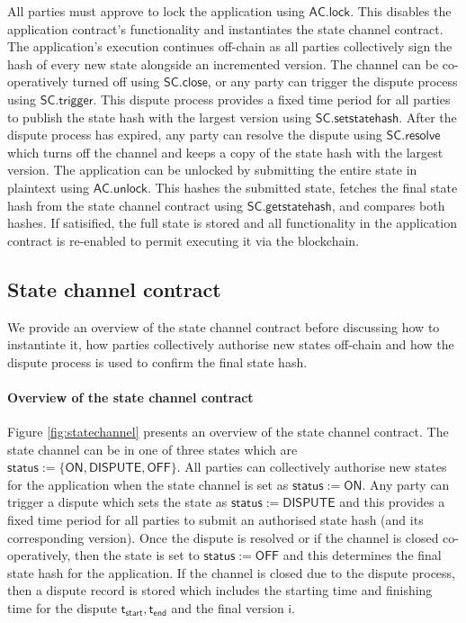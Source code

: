 \documentclass{llncs}
\newcommand{\chanstatus}{\mathsf{status}}
\newcommand{\chanon}{\mathsf{ON}}
\newcommand{\chandispute}{\mathsf{DISPUTE}}
\newcommand{\chanoff}{\mathsf{OFF}}
\newcommand{\monotoniccounter}{\mathsf{i}}
\newcommand{\statechanneldispute}{\mathsf{SC}.\mathsf{trigger}}
\newcommand{\statechannelsetstate}{\mathsf{SC}.\mathsf{setstatehash}}
\newcommand{\statechannelresolve}{\mathsf{SC}.\mathsf{resolve}}
\newcommand{\statechannelgetcommitment}{\mathsf{SC}.\mathsf{getstatehash}}
\newcommand{\statechannelclose}{\mathsf{SC}.\mathsf{close}}
\newcommand{\applock}{\mathsf{AC.lock}}
\newcommand{\appunlock}{\mathsf{AC.unlock}}
\newcommand{\timestart}{\mathsf{t}_{\mathsf{start}}}
\newcommand{\timeend}{\mathsf{t}_{\mathsf{end}}}
\begin{document}
All parties must approve to lock the application using $\applock$.
This disables the application contract's functionality and instantiates the state channel contract. 
The application's execution continues off-chain as all parties collectively sign the hash of every new state alongside an incremented version. %
The channel can be co-operatively turned off using $\statechannelclose$, or any party can trigger the dispute process using $\statechanneldispute$.
This dispute process provides  a fixed time period  for all parties to publish the state hash with the largest version using $\statechannelsetstate$. 
After the dispute process has expired, any party can resolve the dispute using $\statechannelresolve$ which turns off the channel and keeps a copy of the state hash with the largest version. 
The application can be unlocked by submitting the entire state in plaintext using $\appunlock$. 
This  hashes the submitted state, fetches the final state hash from the state channel contract using $\statechannelgetcommitment$, and  compares both hashes.
If satisified, the full state is stored and all functionality in the application contract is re-enabled to permit executing it via the blockchain. 
\subsection{State channel contract}

We provide an overview of the state channel contract before discussing how to instantiate it,  how parties collectively authorise new states off-chain and how the dispute process is used to confirm the final state hash. 

\paragraph{Overview of the state channel contract} 
Figure \ref{fig:statechannel} presents an overview of the state channel contract.
The state channel can be in one of three states which are $\chanstatus := \{\chanon, \chandispute, \chanoff\}$.
All parties can collectively authorise new states for the application when the state channel is set as $\chanstatus := \chanon$.
Any party can trigger a dispute which sets the state as $\chanstatus := \chandispute$ and this provides a fixed time period for all parties to submit an authorised state hash (and its corresponding version).
Once the dispute is resolved or if the channel is closed co-operatively, then the state is set to $\chanstatus := \chanoff$ and this determines the final state hash for the application. 
If the channel is closed due to the dispute process, then a dispute record is stored which includes the starting time and finishing time for the dispute $\timestart, \timeend$ and the final version $\monotoniccounter$.
\end{document}
